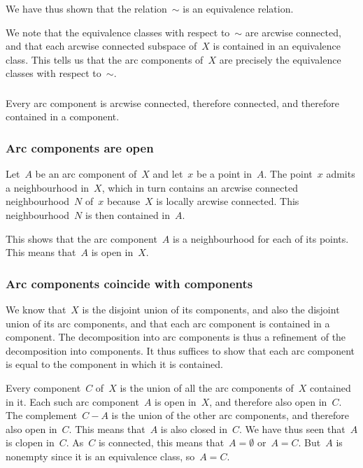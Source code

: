 We have thus shown that the relation~$∼$ is an equivalence relation.

We note that the equivalence classes with respect to~$∼$ are arcwise connected, and that each arcwise connected subspace of~$X$ is contained in an equivalence class.
This tells us that the arc components of~$X$ are precisely the equivalence classes with respect to~$∼$.



\subsubsection{}

Every arc component is arcwise connected, therefore connected, and therefore contained in a component.



\subsubsection{}

\subsubsection*{Arc components are open}

Let~$A$ be an arc component of~$X$ and let~$x$ be a point in~$A$.
The point~$x$ admits a neighbourhood in~$X$, which in turn contains an arcwise connected neighbourhood~$N$ of~$x$ because~$X$ is locally arcwise connected.
This neighbourhood~$N$ is then contained in~$A$.

This shows that the arc component~$A$ is a neighbourhood for each of its points.
This means that~$A$ is open in~$X$.

\subsubsection*{Arc components coincide with components}

We know that~$X$ is the disjoint union of its components, and also the disjoint union of its arc components, and that each arc component is contained in a component.
The decomposition into arc components is thus a refinement of the decomposition into components.
It thus suffices to show that each arc component is equal to the component in which it is contained.

Every component~$C$ of~$X$ is the union of all the arc components of~$X$ contained in it.
Each such arc component~$A$ is open in~$X$, and therefore also open in~$C$.
The complement~$C - A$ is the union of the other arc components, and therefore also open in~$C$.
This means that~$A$ is also closed in~$C$.
We have thus seen that~$A$ is clopen in~$C$.
As~$C$ is connected, this means that~$A = ∅$ or~$A = C$.
But~$A$ is nonempty since it is an equivalence class, so~$A = C$.



